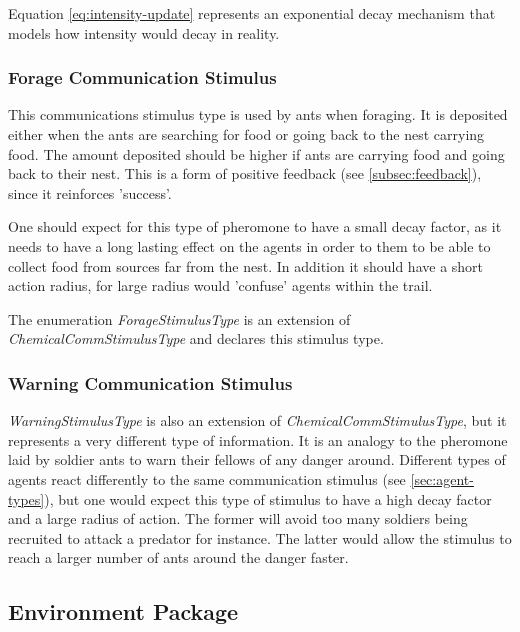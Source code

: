 Equation \ref{eq:intensity-update} represents an exponential decay mechanism that models how intensity would decay in reality.

\subsubsection {Forage Communication Stimulus}
\label{subsec:forage-stimulus}

This communications stimulus type is used by ants when foraging. It is deposited either when the ants are searching for food or going back to the nest carrying food. The amount deposited should be higher if ants are carrying food and going back to their nest. This is a form of positive feedback (see \ref{subsec:feedback}), since it reinforces 'success'.

One should expect for this type of pheromone to have a small decay factor, as it needs to have a long lasting effect on the agents in order to them to be able to collect food from sources far from the nest. In addition it should have a short action radius, for large radius would 'confuse' agents within the trail.

The enumeration \emph{ForageStimulusType} is an extension of \emph{ChemicalCommStimulusType} and declares this stimulus type.

\subsubsection {Warning Communication Stimulus}

\emph{WarningStimulusType} is also an extension of \emph{ChemicalCommStimulusType}, but it represents a very different type of information. It is an analogy to the pheromone laid by soldier ants to warn their fellows of any danger around. Different types of agents react differently to the same communication stimulus (see \ref{sec:agent-types}), but one would expect this type of stimulus to have a high decay factor and a large radius of action. The former will avoid too many soldiers being recruited to attack a predator for instance. The latter would allow the stimulus to reach a larger number of ants around the danger faster.

\subsection{Environment Package}

